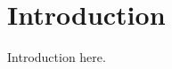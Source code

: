 \documentclass[ ../main.tex]{subfiles}
\begin{document}
\section{Introduction}
Introduction here.
\end{document}
